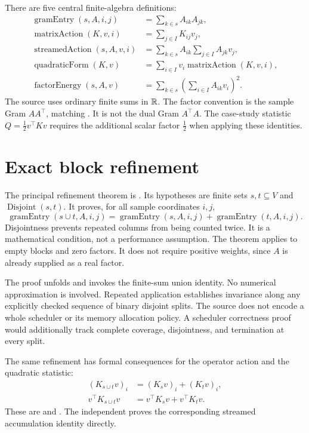There are five central finite-algebra definitions:
\begin{align*}
 \operatorname{gramEntry}(s,A,i,j)&=\sum_{k\in s}A_{ik}A_{jk},\\[6pt]
 \operatorname{matrixAction}(K,v,i)&=\sum_{j\in I}K_{ij}v_j,\\[6pt]
 \operatorname{streamedAction}(s,A,v,i)&=\sum_{k\in s}A_{ik}\sum_{j\in I}A_{jk}v_j,\\[6pt]
 \operatorname{quadraticForm}(K,v)&=\sum_{i\in I}v_i\operatorname{matrixAction}(K,v,i),\\[6pt]
 \operatorname{factorEnergy}(s,A,v)&=\sum_{k\in s}\left(\sum_{i\in I}A_{ik}v_i\right)^2.
\end{align*}
The source uses ordinary finite sums in $\mathbb R$. The factor convention is the
sample Gram $AA^\top$, matching . It is not the dual
Gram $A^\top A$. The case-study statistic $Q=\tfrac12 v^\top Kv$ requires the
additional scalar factor $\tfrac12$ when applying these identities.

\section{Exact block refinement}

The principal refinement theorem is . Its hypotheses
are finite sets $s,t\subseteq V$ and $\operatorname{Disjoint}(s,t)$. It proves,
for all sample coordinates $i,j$,
\[
 \operatorname{gramEntry}(s\cup t,A,i,j)
 =\operatorname{gramEntry}(s,A,i,j)+\operatorname{gramEntry}(t,A,i,j).
\]
Disjointness prevents repeated columns from being counted twice. It is a
mathematical condition, not a performance assumption. The theorem applies to
empty blocks and zero factors. It does not require positive weights, since
$A$ is already supplied as a real factor.

The proof unfolds  and invokes the finite-sum union identity.
No numerical approximation is involved. Repeated application establishes
invariance along any explicitly checked sequence of binary disjoint splits.
The source does not encode a whole scheduler or its memory allocation policy.
A scheduler correctness proof would additionally track complete coverage,
disjointness, and termination at every split.

The same refinement has formal consequences for the operator action and the
quadratic statistic:
\begin{align*}
 (K_{s\cup t}v)_i&=(K_s v)_i+(K_t v)_i,\\
 v^\top K_{s\cup t}v&=v^\top K_s v+v^\top K_t v.
\end{align*}
These are  and
. The independent
 proves the corresponding streamed accumulation
identity directly.

